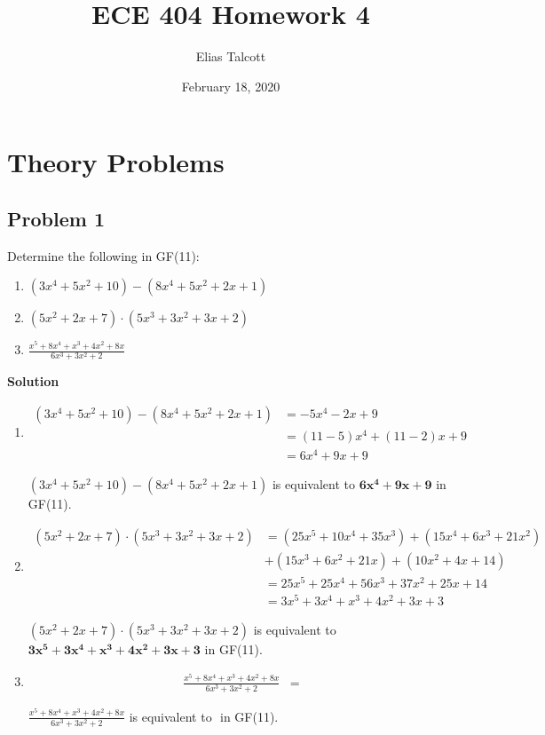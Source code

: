 \documentclass[11pt]{article}
\def \myTitle {ECE 404 Homework 4}
\def \myName {Elias Talcott}
\def \myDate {February 18, 2020}
\begin{document}
\begin{titlepage}
\title{\myTitle}
\author{\myName}
\date{\myDate}
\maketitle
\vspace{1in}
\tableofcontents
\thispagestyle{empty}
\end{titlepage}

\section{Theory Problems}

\subsection{Problem 1}
Determine the following in GF(11):

\begin{enumerate}[label=(\alph*)]
\item $(3x^4 + 5x^2 + 10) - (8x^4 + 5x^2 + 2x + 1)$
\item $(5x^2 + 2x + 7) \cdot (5x^3 + 3x^2 + 3x + 2)$
\item $\displaystyle{\frac{x^5 + 8x^4 + x^3 + 4x^2 + 8x}{6x^3 + 3x^2 + 2}}$
\end{enumerate}

\textbf{Solution}

\begin{enumerate}[label=(\alph*)]
\item
\[
	\begin{split}
		(3x^4 + 5x^2 + 10) - (8x^4 + 5x^2 + 2x + 1) &= -5x^4 - 2x + 9
		\\
		&= (11-5)x^4 + (11-2)x + 9
		\\
		&= 6x^4 + 9x + 9
	\end{split}
\]

$(3x^4 + 5x^2 + 10) - (8x^4 + 5x^2 + 2x + 1)$ is equivalent to $\mathbf{6x^4 + 9x + 9}$ in GF(11).

\item
\[
	\begin{split}
		(5x^2 + 2x + 7) \cdot (5x^3 + 3x^2 + 3x + 2) &= (25x^5 + 10x^4 + 35x^3) + (15x^4 + 6x^3 + 21x^2)
		\\
		&+ (15x^3 + 6x^2 + 21x) + (10x^2 + 4x + 14)
		\\
		&= 25x^5 + 25x^4 + 56x^3 + 37x^2 + 25x + 14
		\\
		&= 3x^5 + 3x^4 + x^3 + 4x^2 + 3x + 3
	\end{split}
\]

$(5x^2 + 2x + 7) \cdot (5x^3 + 3x^2 + 3x + 2)$ is equivalent to $\mathbf{3x^5 + 3x^4 + x^3 + 4x^2 + 3x + 3}$ in GF(11).

\item
\[
	\begin{split}
		\displaystyle{\frac{x^5 + 8x^4 + x^3 + 4x^2 + 8x}{6x^3 + 3x^2 + 2}} &= 
	\end{split}
\]

$\displaystyle{\frac{x^5 + 8x^4 + x^3 + 4x^2 + 8x}{6x^3 + 3x^2 + 2}}$ is equivalent to $\mathbf{}$ in GF(11).

\end{enumerate}
\end{document}

